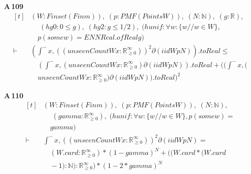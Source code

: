 \noindent\textbf{A\,109}\quad{}
{\footnotesize\[ \begin{aligned}[t]
&(\mathit{W} : \mathit{Finset} (\mathit{Fin} \mathit{m})),\; (\mathit{p} : \mathit{PMF} (\mathit{Points} \mathit{W})),\; (\mathit{N} : \mathbb{N} ),\; (\mathit{g} : \mathbb{R} ),\\
&\quad \; (\mathit{hg0} : 0 \leq \mathit{g}),\; (\mathit{hg2} : \mathit{g} \leq 1/2),\; (\mathit{hunif} : \forall \mathit{w} : \{ \mathit{w} // \mathit{w} \in \mathit{W}\} ,\\
&\quad \mathit{p} (\mathit{some} \mathit{w}) = \mathit{ENNReal}.\mathit{ofReal} \mathit{g})\\
\vdash\;&(\int^{-} \mathit{x}, ((\mathit{unseenCount} \mathit{W} \mathit{x} : \mathbb{R}_{\geq0}^{\infty} ))^{2} ∂(\mathit{iid} \mathit{W} \mathit{p} \mathit{N})).\mathit{toReal} \leq\\
&\quad (\int^{-} \mathit{x}, (\mathit{unseenCount} \mathit{W} \mathit{x} : \mathbb{R}_{\geq0}^{\infty} ) ∂(\mathit{iid} \mathit{W} \mathit{p} \mathit{N})).\mathit{toReal} + ((\int^{-} \mathit{x}, (\\
&\quad \mathit{unseenCount} \mathit{W} \mathit{x} : \mathbb{R}_{\geq0}^{\infty} ) ∂(\mathit{iid} \mathit{W} \mathit{p} \mathit{N})).\mathit{toReal})^{2}
\end{aligned} \]}

\noindent\textbf{A\,110}\quad{}
{\footnotesize\[ \begin{aligned}[t]
&(\mathit{W} : \mathit{Finset} (\mathit{Fin} \mathit{m})),\; (\mathit{p} : \mathit{PMF} (\mathit{Points} \mathit{W})),\; (\mathit{N} : \mathbb{N} ),\\
&\quad \; (\mathit{gamma} : \mathbb{R}_{\geq0}^{\infty} ),\; (\mathit{hunif} : \forall \mathit{w} : \{ \mathit{w} // \mathit{w} \in \mathit{W}\} , \mathit{p} (\mathit{some} \mathit{w}) =\\
&\quad \mathit{gamma})\\
\vdash\;&\int^{-} \mathit{x}, ((\mathit{unseenCount} \mathit{W} \mathit{x} : \mathbb{R}_{\geq0}^{\infty} ))^{2} ∂(\mathit{iid} \mathit{W} \mathit{p} \mathit{N}) =\\
&\quad (\mathit{W}.\mathit{card} : \mathbb{R}_{\geq0}^{\infty} ) * (1 - \mathit{gamma})^{\mathit{N}} + ((\mathit{W}.\mathit{card} * (\mathit{W}.\mathit{card}\\
&\quad - 1) : \mathbb{N} ) : \mathbb{R}_{\geq0}^{\infty} ) * (1 - 2 * \mathit{gamma})^{\mathit{N}}
\end{aligned} \]}

